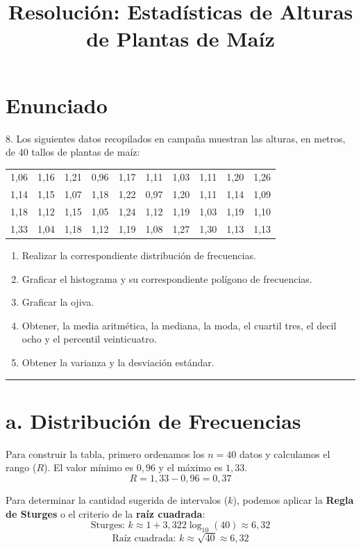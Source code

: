 \documentclass[12pt, a4paper]{article}
\title{Resolución: Estadísticas de Alturas de Plantas de Maíz}
\author{}
\date{}
\begin{document}
\maketitle

\section*{Enunciado}
8. Los siguientes datos recopilados en campaña muestran las alturas, en metros, de 40 tallos de plantas de maíz:

\begin{center}
\begin{tabular}{cccccccccc}
1,06 & 1,16 & 1,21 & 0,96 & 1,17 & 1,11 & 1,03 & 1,11 & 1,20 & 1,26 \\
1,14 & 1,15 & 1,07 & 1,18 & 1,22 & 0,97 & 1,20 & 1,11 & 1,14 & 1,09 \\
1,18 & 1,12 & 1,15 & 1,05 & 1,24 & 1,12 & 1,19 & 1,03 & 1,19 & 1,10 \\
1,33 & 1,04 & 1,18 & 1,12 & 1,19 & 1,08 & 1,27 & 1,30 & 1,13 & 1,13 \\
\end{tabular}
\end{center}

\begin{enumerate}
    \item[a.] Realizar la correspondiente distribución de frecuencias.
    \item[b.] Graficar el histograma y su correspondiente polígono de frecuencias.
    \item[c.] Graficar la ojiva.
    \item[d.] Obtener, la media aritmética, la mediana, la moda, el cuartil tres, el decil ocho y el percentil veinticuatro.
    \item[e.] Obtener la varianza y la desviación estándar.
\end{enumerate}

\vspace{1cm}
\hrule
\vspace{1cm}

\section*{a. Distribución de Frecuencias}
Para construir la tabla, primero ordenamos los $n=40$ datos y calculamos el rango ($R$).
El valor mínimo es $0,96$ y el máximo es $1,33$.
\[ R = 1,33 - 0,96 = 0,37 \]

Para determinar la cantidad sugerida de intervalos ($k$), podemos aplicar la \textbf{Regla de Sturges} o el criterio de la \textbf{raíz cuadrada}:
\[ \text{Sturges: } k \approx 1 + 3,322 \log_{10}(40) \approx 6,32 \]
\[ \text{Raíz cuadrada: } k \approx \sqrt{40} \approx 6,32 \]
\end{document}
